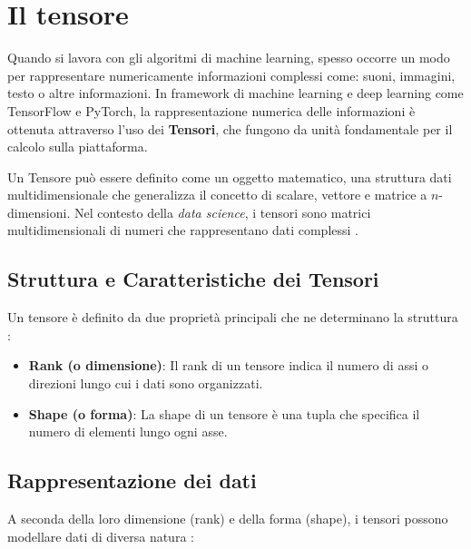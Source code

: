 \section{Il tensore}
Quando si lavora con gli algoritmi di machine learning, spesso occorre un modo per
rappresentare numericamente informazioni complessi come: suoni, immagini, testo o 
altre informazioni. 
In framework di machine learning e deep learning come TensorFlow e PyTorch,
la rappresentazione numerica delle informazioni è ottenuta attraverso
l'uso dei \textbf{Tensori}, che fungono da unità fondamentale 
per il calcolo sulla piattaforma. 

Un Tensore può essere definito come un oggetto matematico, una struttura dati 
multidimensionale che generalizza il concetto di scalare, vettore e 
matrice a $n$-dimensioni. Nel contesto della \textit{data science}, i tensori 
sono matrici multidimensionali di numeri che rappresentano dati complessi
\cite{Tensore_Fidacaro,Tensore_IBM,tensor_analytic,tensor_medium1,tensor_medium2,tensor_strano}. 

\subsection{Struttura e Caratteristiche dei Tensori}
Un tensore è definito da due proprietà principali che ne determinano la 
struttura \cite{Tensore_Fidacaro} :

\begin{itemize}
    \item \textbf{Rank (o dimensione)}:  
    Il rank di un tensore indica il numero di assi o direzioni lungo cui i dati 
    sono organizzati.
    
    \item \textbf{Shape (o forma)}:  
    La shape di un tensore è una tupla che specifica il numero di elementi lungo ogni asse. 
\end{itemize}

\subsection{Rappresentazione dei dati}
A seconda della loro dimensione (rank) e della forma (shape), i tensori possono modellare 
dati di diversa natura \cite{Tensore_Fidacaro}:


